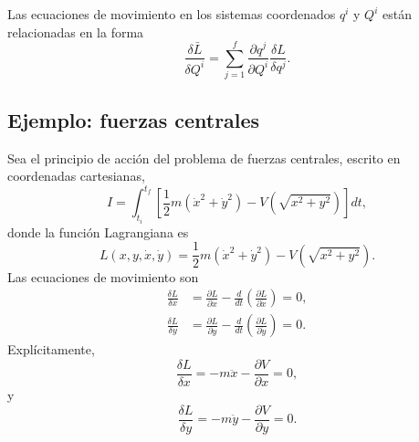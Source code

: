 \documentclass[../apunte_mecanica_clasica.tex]{subfiles}
\begin{document}
Las ecuaciones de movimiento en los sistemas coordenados \(q^i\) y \(Q^i\) están relacionadas en la forma
\begin{equation}
    \frac{\delta \bar L}{\delta Q^i}
    =\sum_{j=1}^{f}\frac{\partial q^j}{\partial Q^i}\frac{\delta L}{\delta q^j}.
    \label{eq:tc-relacion-variacionales}
\end{equation}

\subsection{Ejemplo: fuerzas centrales}
\label{subsec:tc-ejemplo-fuerzas-centrales}

Sea el principio de acción del problema de fuerzas centrales, escrito en coordenadas cartesianas,
\begin{equation}
    I=\int_{t_i}^{t_f}
    \left[
    \frac{1}{2}m(\dot x^2+\dot y^2)-V\left(\sqrt{x^2+y^2}\right)
    \right]dt,
    \label{eq:tc-accion-fuerzas-centrales-cart}
\end{equation}
donde la función Lagrangiana es
\begin{equation}
    L(x,y,\dot x,\dot y)
    =\frac{1}{2}m(\dot x^2+\dot y^2)-V\left(\sqrt{x^2+y^2}\right).
    \label{eq:tc-l-fuerzas-centrales-cart}
\end{equation}
Las ecuaciones de movimiento son
\begin{align}
    \frac{\delta L}{\delta x}
    &=\frac{\partial L}{\partial x}
    -\frac{d}{dt}\left(\frac{\partial L}{\partial \dot x}\right)=0,
    \label{eq:tc-eq-x-central}\\
    \frac{\delta L}{\delta y}
    &=\frac{\partial L}{\partial y}
    -\frac{d}{dt}\left(\frac{\partial L}{\partial \dot y}\right)=0.
    \label{eq:tc-eq-y-central}
\end{align}
Explícitamente,
\begin{equation}
    \frac{\delta L}{\delta x}
    =-m\ddot x-\frac{\partial V}{\partial x}=0,
    \label{eq:tc-central-x-final}
\end{equation}
y
\begin{equation}
    \frac{\delta L}{\delta y}
    =-m\ddot y-\frac{\partial V}{\partial y}=0.
    \label{eq:tc-central-y-final}
\end{equation}
\end{document}
